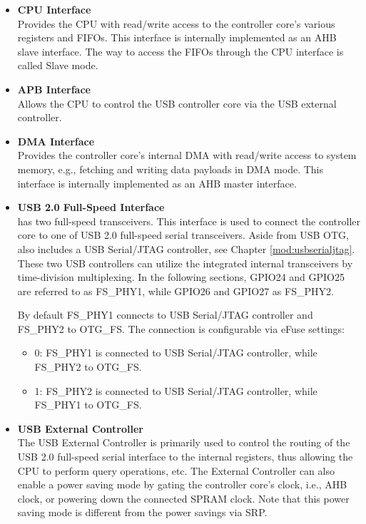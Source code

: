 \documentclass[main\_\_EN.tex]{subfiles}
\begin{document}
\begin{itemize}
    \item {\bfseries CPU Interface}\\
   Provides the CPU with read/write access to the controller core’s various registers and FIFOs. This interface is internally implemented as an AHB slave interface. The way to access the FIFOs through the CPU interface is called Slave mode.

   \item {\bfseries APB Interface}\\
    Allows the CPU to control the USB controller core via the USB external controller.

    \item {\bfseries DMA Interface}\\
    Provides the controller core’s internal DMA with read/write access to system memory, e.g., fetching and writing data payloads in DMA mode. This interface is internally implemented as an AHB master interface.

    \item {\bfseries USB 2.0 Full-Speed Interface}\\
   \chipname{} has two full-speed transceivers. This interface is used to connect the controller core to one of USB 2.0 full-speed serial transceivers. Aside from USB OTG, \chipname{} also includes a USB Serial/JTAG controller, see Chapter \ref{mod:usbserialjtag}\textit{}. These two USB controllers can utilize the integrated internal transceivers by time-division multiplexing. In the following sections, GPIO24 and GPIO25 are referred to as FS\_PHY1, while GPIO26 and GPIO27 as FS\_PHY2.

   By default FS\_PHY1 connects to USB Serial/JTAG controller and FS\_PHY2 to OTG\_FS. The connection is configurable via eFuse settings:
   \begin{itemize}
        \item 0: FS\_PHY1 is connected to USB Serial/JTAG controller, while FS\_PHY2 to OTG\_FS.
        \item 1: FS\_PHY2 is connected to USB Serial/JTAG controller, while FS\_PHY1 to OTG\_FS.
    \end{itemize}

    \item {\bfseries USB External Controller}\\
    The USB External Controller is primarily used to control the routing of the USB 2.0 full-speed serial interface to the internal registers, thus allowing the CPU to perform query operations, etc. The External Controller can also enable a power saving mode by gating the controller core’s clock, i.e., AHB clock, or powering down the connected SPRAM clock. Note that this power saving mode is different from the power savings via SRP.


\end{itemize}
\end{document}
